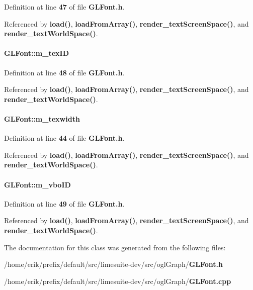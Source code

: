 Definition at line {\bf 47} of file {\bf G\+L\+Font.\+h}.



Referenced by {\bf load()}, {\bf load\+From\+Array()}, {\bf render\+\_\+text\+Screen\+Space()}, and {\bf render\+\_\+text\+World\+Space()}.

\paragraph[{m\+\_\+tex\+ID}]{ G\+L\+Font\+::m\+\_\+tex\+ID}\label{classGLFont_a31584c268a86c5b1084c5d781f797934}


Definition at line {\bf 48} of file {\bf G\+L\+Font.\+h}.



Referenced by {\bf load()}, {\bf load\+From\+Array()}, {\bf render\+\_\+text\+Screen\+Space()}, and {\bf render\+\_\+text\+World\+Space()}.

\paragraph[{m\+\_\+texwidth}]{ G\+L\+Font\+::m\+\_\+texwidth}\label{classGLFont_a297b5b006c262661b9cfc7b3767429a8}


Definition at line {\bf 44} of file {\bf G\+L\+Font.\+h}.



Referenced by {\bf load()}, {\bf load\+From\+Array()}, {\bf render\+\_\+text\+Screen\+Space()}, and {\bf render\+\_\+text\+World\+Space()}.

\paragraph[{m\+\_\+vbo\+ID}]{ G\+L\+Font\+::m\+\_\+vbo\+ID}\label{classGLFont_a3df21911bbb484849ccf7f9fb62d3898}


Definition at line {\bf 49} of file {\bf G\+L\+Font.\+h}.



Referenced by {\bf load()}, {\bf load\+From\+Array()}, {\bf render\+\_\+text\+Screen\+Space()}, and {\bf render\+\_\+text\+World\+Space()}.



The documentation for this class was generated from the following files\+:\begin{DoxyCompactItemize}
\item 
/home/erik/prefix/default/src/limesuite-\/dev/src/ogl\+Graph/{\bf G\+L\+Font.\+h}\item 
/home/erik/prefix/default/src/limesuite-\/dev/src/ogl\+Graph/{\bf G\+L\+Font.\+cpp}\end{DoxyCompactItemize}
